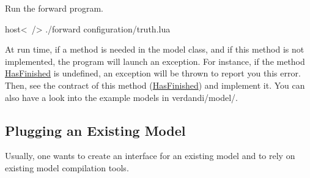\documentclass{tufte-book}
\begin{document}
\begin{DoxyItemize}
\item \-Run the forward program.

\begin{frame_bash}
host<~/> ./forward configuration/truth.\-lua
\end{frame_bash}

\-At run time, if a method is needed in the model class, and if this method is not implemented, the program will launch an exception. \-For instance, if the method \hyperlink{class_verdandi_1_1_model_template_a4aa54740408c0e5ef7e6b1c8a10a4c2d}{\-Has\-Finished} is undefined, an exception will be thrown to report you this error. \-Then, see the contract of this method (\hyperlink{class_verdandi_1_1_model_template_a4aa54740408c0e5ef7e6b1c8a10a4c2d}{\-Has\-Finished}) and implement it. \-You can also have a look into the example models in {\ttfamily verdandi/model/}.


\end{DoxyItemize}\hypertarget{plugging_model_existing_model}{}\subsection{\-Plugging an Existing Model}\label{plugging_model_existing_model}
\-Usually, one wants to create an interface for an existing model and to rely on existing model compilation tools.
\end{document}
